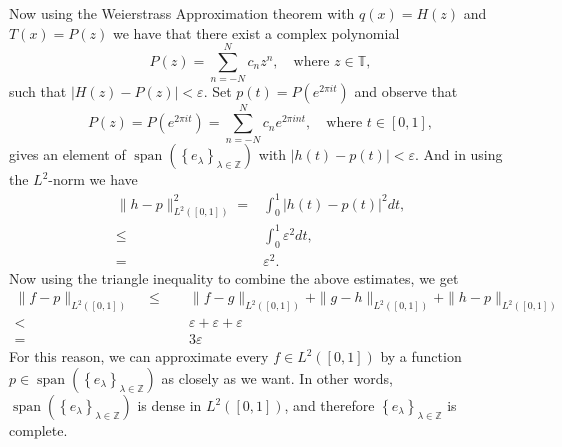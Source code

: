 \documentclass[../thesis.tex]{subfiles}
\begin{document}
Now using the Weierstrass Approximation theorem with $q(x)= H(z)$ and $T(x) = P(z)$ we have that there exist a complex polynomial
\begin{equation*}
    P(z)= \sum_{n=-N}^{N}c_n z^n, \quad \text{where }z\in \mathbb{T},    
\end{equation*}
such that $| H(z)-P(z) | < \varepsilon$. Set $p(t) =P(e^{2\pi it})$ and observe that
\begin{equation*}
P(z)= P(e^{2\pi it})= \sum_{n=-N}^{N}c_n e^{2\pi int}, \quad \text{where }t\in [0,1],
\end{equation*}
gives an element of $\operatorname{span} \left( \left\{ e_{\lambda} \right\}_{\lambda\in \mathbb{Z}} \right)$ with $| h(t)-p(t) | < \varepsilon$.
And in using the $L^2$-norm we have
\begin{align*}
    \| h-p \|_{L^2([0,1])}^2 =& \int_0^1 \left|h(t)-p(t) \right|^2dt, \\ 
    \leq &\int_0^1 \varepsilon^2 dt,\\ 
    =& \varepsilon^2.
\end{align*}
Now using the triangle inequality to combine the above estimates, we get
\begin{align*} 
    \| f-p\|_{L^2([0,1])} \quad \leq&\quad  \| f-g\|_{L^2([0,1])} + \| g-h\|_{L^2([0,1])} +\| h-p\|_{L^2([0,1])}\\
    <& \quad \varepsilon + \varepsilon +\varepsilon \\
    =& \quad 3 \varepsilon
\end{align*}
For this reason, we can approximate every $f\in L^2([0,1])$ by a function $p \in \operatorname{span} \left( \left\{ e_{\lambda} \right\}_{\lambda\in \mathbb{Z}} \right)$ as closely as we want. In other words,  $\operatorname{span} \left( \left\{ e_{\lambda} \right\}_{\lambda\in \mathbb{Z}} \right)$ is dense in $L^2([0,1])$, and therefore $\left\{ e_{\lambda} \right\}_{\lambda\in \mathbb{Z}}$ is complete. %
\end{document}
